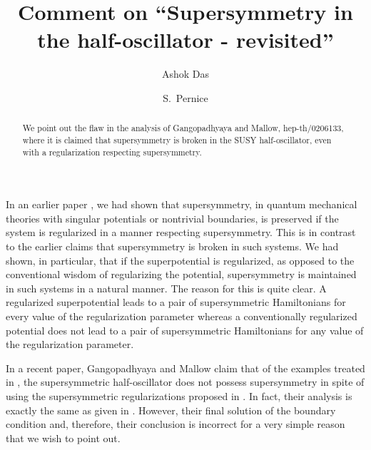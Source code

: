 \documentclass[a4paper,amssymb,aps]{revtex4}
\begin{document}
\title{Comment on ``Supersymmetry in the half-oscillator - revisited''}

\author{Ashok Das}
\author{S.~Pernice}
\bigskip

\begin{abstract}

We point out the flaw in the analysis of Gangopadhyaya and Mallow,
hep-th/0206133, where it is claimed that supersymmetry is broken in
the SUSY half-oscillator, even with a regularization respecting
supersymmetry. 

\end{abstract}

\maketitle

In an earlier paper \cite{das}, we had shown that supersymmetry, in
quantum mechanical theories with singular potentials or nontrivial
boundaries, is preserved if the system is regularized in a manner
respecting supersymmetry. This is in contrast to the earlier claims 
\cite{jevicki,roy,cooper} that supersymmetry is broken in such
systems. We  had shown, in particular, that if the superpotential is
regularized,  as opposed to the conventional wisdom of regularizing the
potential, supersymmetry is maintained in such systems in a natural
manner.  The reason for this is
quite clear. A regularized superpotential leads to a pair of
supersymmetric Hamiltonians for every value of the regularization
parameter 
whereas a conventionally regularized potential does not lead to a pair
of supersymmetric Hamiltonians for any value of the regularization
parameter. 

In a recent paper, Gangopadhyaya and Mallow \cite{asim} claim that of
the examples treated in \cite{das}, the supersymmetric half-oscillator
does not possess supersymmetry in spite of using the supersymmetric
regularizations proposed in \cite{das}. In fact, their analysis is
exactly the  same as given
in \cite{das}. However, their final solution of the boundary condition
and, therefore, their conclusion is
incorrect for a very simple reason that we wish to point out.
\end{document}

